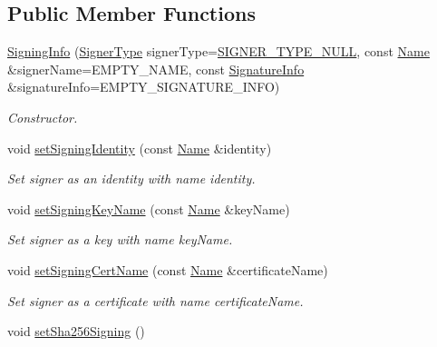 \subsection*{Public Member Functions}
\begin{DoxyCompactItemize}
\item 
\hyperlink{classndn_1_1security_1_1SigningInfo_ae47077b9fe56adcea180af744cafec00}{Signing\+Info} (\hyperlink{classndn_1_1security_1_1SigningInfo_aae7126c0334e630976d1efbaae3c0102}{Signer\+Type} signer\+Type=\hyperlink{classndn_1_1security_1_1SigningInfo_aae7126c0334e630976d1efbaae3c0102a9b67fe6a8d2d05ebfd00f7dc8d0e5709}{S\+I\+G\+N\+E\+R\+\_\+\+T\+Y\+P\+E\+\_\+\+N\+U\+LL}, const \hyperlink{classndn_1_1Name}{Name} \&signer\+Name=E\+M\+P\+T\+Y\+\_\+\+N\+A\+ME, const \hyperlink{classndn_1_1SignatureInfo}{Signature\+Info} \&signature\+Info=E\+M\+P\+T\+Y\+\_\+\+S\+I\+G\+N\+A\+T\+U\+R\+E\+\_\+\+I\+N\+FO)
\begin{DoxyCompactList}\small\item\em Constructor. \end{DoxyCompactList}\item 
void \hyperlink{classndn_1_1security_1_1SigningInfo_aa38bcc1eac9d2cc3a88e415eabf18ce3}{set\+Signing\+Identity} (const \hyperlink{classndn_1_1Name}{Name} \&identity)
\begin{DoxyCompactList}\small\item\em Set signer as an identity with name {\ttfamily identity}. \end{DoxyCompactList}\item 
void \hyperlink{classndn_1_1security_1_1SigningInfo_aa8615a5b2727f51bc8bbe0dd4d8f72c6}{set\+Signing\+Key\+Name} (const \hyperlink{classndn_1_1Name}{Name} \&key\+Name)
\begin{DoxyCompactList}\small\item\em Set signer as a key with name {\ttfamily key\+Name}. \end{DoxyCompactList}\item 
void \hyperlink{classndn_1_1security_1_1SigningInfo_a66b8bfd9388242cd31fc68fa65ca8c3e}{set\+Signing\+Cert\+Name} (const \hyperlink{classndn_1_1Name}{Name} \&certificate\+Name)
\begin{DoxyCompactList}\small\item\em Set signer as a certificate with name {\ttfamily certificate\+Name}. \end{DoxyCompactList}\item 
void \hyperlink{classndn_1_1security_1_1SigningInfo_a27afb75996dfdb7c116464e27d8a5960}{set\+Sha256\+Signing} ()

\end{DoxyCompactItemize}

